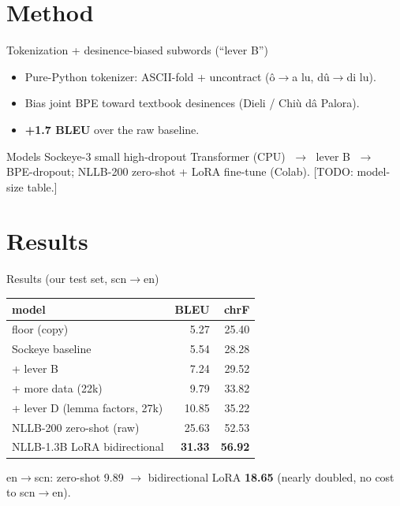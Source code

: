 \documentclass{beamer}
\newcommand{\TODO}[1]{{\color{red}[TODO: #1]}}
\begin{document}
\section{Method}
\begin{frame}{Tokenization + desinence-biased subwords (``lever B'')}
  \begin{itemize}
    \item Pure-Python tokenizer: ASCII-fold + uncontract (\^o$\to$a lu, d\^u$\to$di lu).
    \item Bias joint BPE toward textbook desinences (Dieli / Chi\`u d\^a Palora).
    \item \textbf{+1.7 BLEU} over the raw baseline.
  \end{itemize}
\end{frame}

\begin{frame}{Models}
  Sockeye-3 small high-dropout Transformer (CPU) $\;\to\;$ lever B $\;\to\;$ BPE-dropout;
  NLLB-200 zero-shot + LoRA fine-tune (Colab). \TODO{model-size table.}
\end{frame}

\section{Results}
\begin{frame}{Results (our test set, scn$\rightarrow$en)}
  \begin{table}\centering
  \begin{tabular}{lrr}
    \toprule model & BLEU & chrF \\\midrule
    floor (copy) & 5.27 & 25.40 \\
    Sockeye baseline & 5.54 & 28.28 \\
    + lever B & 7.24 & 29.52 \\
    + more data (22k) & 9.79 & 33.82 \\
    + lever D (lemma factors, 27k) & 10.85 & 35.22 \\
    NLLB-200 zero-shot (raw) & 25.63 & 52.53 \\
    NLLB-1.3B LoRA bidirectional & \textbf{31.33} & \textbf{56.92} \\
    \bottomrule
  \end{tabular}
  \end{table}
  \footnotesize en$\rightarrow$scn: zero-shot 9.89 $\to$ bidirectional LoRA \textbf{18.65}
  (nearly doubled, no cost to scn$\rightarrow$en).
\end{frame}
\end{document}
